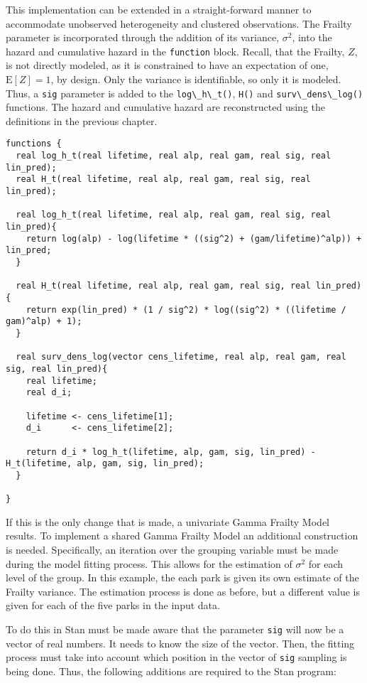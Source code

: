 This implementation can be extended in a straight-forward manner to accommodate unobserved heterogeneity and clustered observations. The Frailty parameter is incorporated through the addition of its variance, $\sigma^2$, into the hazard and cumulative hazard in the \lstinline{function} block. Recall, that the Frailty, $Z$, is not directly modeled, as it is constrained to have an expectation of one, $\mathrm{E}[Z]=1$, by design. Only the variance is identifiable, so only it is modeled. Thus, a \lstinline{sig} parameter is added to the \lstinline{log\_h\_t()}, \lstinline{H()} and \lstinline{surv\_dens\_log()} functions. The hazard and cumulative hazard are reconstructed using the definitions in the previous chapter. 

\begin{lstlisting}
functions {
  real log_h_t(real lifetime, real alp, real gam, real sig, real lin_pred);
  real H_t(real lifetime, real alp, real gam, real sig, real lin_pred);
  
  real log_h_t(real lifetime, real alp, real gam, real sig, real lin_pred){
    return log(alp) - log(lifetime * ((sig^2) + (gam/lifetime)^alp)) + lin_pred;
  }
  
  real H_t(real lifetime, real alp, real gam, real sig, real lin_pred){
    return exp(lin_pred) * (1 / sig^2) * log((sig^2) * ((lifetime / gam)^alp) + 1);
  }
  
  real surv_dens_log(vector cens_lifetime, real alp, real gam, real sig, real lin_pred){
    real lifetime;
    real d_i;
    
    lifetime <- cens_lifetime[1];
    d_i      <- cens_lifetime[2];
  
    return d_i * log_h_t(lifetime, alp, gam, sig, lin_pred) - H_t(lifetime, alp, gam, sig, lin_pred);
  }

}
\end{lstlisting}


If this is the only change that is made, a univariate Gamma Frailty Model results. To implement a shared Gamma Frailty Model an additional construction is needed. Specifically, an iteration over the grouping variable must be made during the model fitting process. This allows for the estimation of $\sigma^2$ for each level of the group. In this example, the each park is given its own estimate of the Frailty variance. The estimation process is done as before, but a different value is given for each of the five parks in the input data.

To do this in Stan must be made aware that the parameter \lstinline{sig} will now be a vector of real numbers. It needs to know the size of the vector. Then, the fitting process must take into account which position in the vector of \lstinline{sig} sampling is being done. Thus, the following additions are required to the Stan program:


